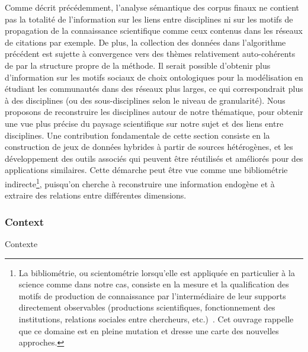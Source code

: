 {Comme décrit précédemment, l'analyse sémantique des corpus finaux ne contient pas la totalité de l'information sur les liens entre disciplines ni sur les motifs de propagation de la connaissance scientifique comme ceux contenus dans les réseaux de citations par exemple. De plus, la collection des données dans l'algorithme précédent est sujette à convergence vers des thèmes relativement auto-cohérents de par la structure propre de la méthode. Il serait possible d'obtenir plus d'information sur les motifs sociaux de choix ontologiques pour la modélisation en étudiant les communautés dans des réseaux plus larges, ce qui correspondrait plus à des disciplines (ou des sous-disciplines selon le niveau de granularité). Nous proposons de reconstruire les disciplines autour de notre thématique, pour obtenir une vue plus précise du paysage scientifique sur notre sujet et des liens entre disciplines. Une contribution fondamentale de cette section consiste en la construction de jeux de données hybrides à partir de sources hétérogènes, et les développement des outils associés qui peuvent être réutilisés et améliorés pour des applications similaires. Cette démarche peut être vue comme une bibliométrie indirecte\footnote{La bibliométrie, ou scientométrie lorsqu'elle est appliquée en particulier à la science comme dans notre cas, consiste en la mesure et la qualification des motifs de production de connaissance par l'intermédiaire de leur supports directement observables (productions scientifiques, fonctionnement des institutions, relations sociales entre chercheurs, etc.)~\cite{cronin2014beyond}. Cet ouvrage rappelle que ce domaine est en pleine mutation et dresse une carte des nouvelles approches.}, puisqu'on cherche à reconstruire une information endogène et à extraire des relations entre différentes dimensions.
}



\subsubsection{Context}{Contexte}




